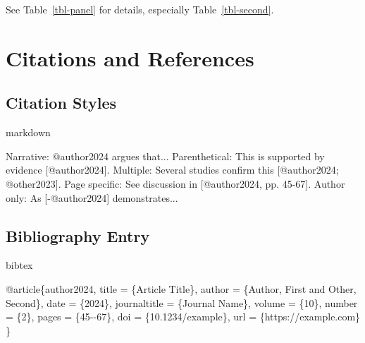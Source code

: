 \documentclass[
  11pt,
  letterpaper,
]{book}
\newenvironment{Shaded}{\begin{snugshade}}{\end{snugshade}}
\newcommand{\AnnotationTok}[1]{\textcolor[rgb]{0.37,0.37,0.37}{#1}}
\newcommand{\CommentTok}[1]{\textcolor[rgb]{0.37,0.37,0.37}{#1}}
\newcommand{\DataTypeTok}[1]{\textcolor[rgb]{0.68,0.00,0.00}{#1}}
\newcommand{\NormalTok}[1]{\textcolor[rgb]{0.00,0.23,0.31}{#1}}
\newcommand{\OtherTok}[1]{\textcolor[rgb]{0.00,0.23,0.31}{#1}}
\newcommand{\VariableTok}[1]{\textcolor[rgb]{0.07,0.07,0.07}{#1}}
\begin{document}
See Table~\ref{tbl-panel} for details, especially
Table~\ref{tbl-second}.

\section*{Citations and References}\label{citations-and-references}


\subsection*{Citation Styles}\label{citation-styles}

markdown

\begin{Shaded}
\begin{Highlighting}[]
\AnnotationTok{Narrative:}\CommentTok{ @author2024 argues that...}
\AnnotationTok{Parenthetical:}\CommentTok{ This is supported by evidence [@author2024].}
\AnnotationTok{Multiple:}\CommentTok{ Several studies confirm this [@author2024; @other2023].}
\AnnotationTok{Page specific:}\CommentTok{ See discussion in [@author2024, pp. 45{-}67].}
\AnnotationTok{Author only:}\CommentTok{ As [{-}@author2024] demonstrates...}
\end{Highlighting}
\end{Shaded}

\subsection*{Bibliography Entry}\label{bibliography-entry}

bibtex

\begin{Shaded}
\begin{Highlighting}[]
\VariableTok{@article}\NormalTok{\{}\OtherTok{author2024}\NormalTok{,}
  \DataTypeTok{title}\NormalTok{ = \{Article Title\},}
  \DataTypeTok{author}\NormalTok{ = \{Author, First and Other, Second\},}
  \DataTypeTok{date}\NormalTok{ = \{2024\},}
  \DataTypeTok{journaltitle}\NormalTok{ = \{Journal Name\},}
  \DataTypeTok{volume}\NormalTok{ = \{10\},}
  \DataTypeTok{number}\NormalTok{ = \{2\},}
  \DataTypeTok{pages}\NormalTok{ = \{45{-}{-}67\},}
  \DataTypeTok{doi}\NormalTok{ = \{10.1234/example\},}
  \DataTypeTok{url}\NormalTok{ = \{https://example.com\}}
\NormalTok{\}}
\end{Highlighting}
\end{Shaded}
\end{document}
